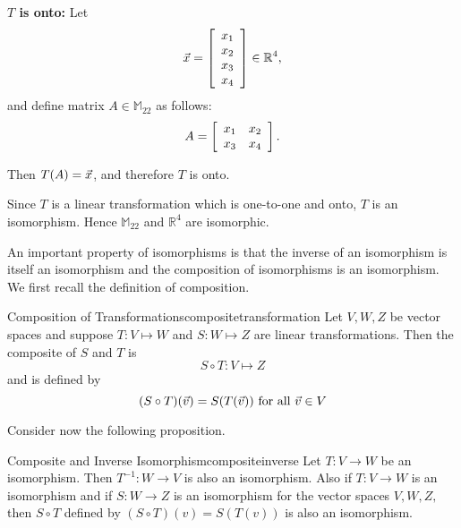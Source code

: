 \begin{solution}
\textbf{$T$ is onto:}
Let
\[ \vec{x}=\left[\begin{array}{c} x_1\\x_2\\x_3\\x_4 \end{array}\right]\in\mathbb{R}^4,\]
and
define matrix $A\in\mathbb{M}_{22}$ as follows:
\[ A=\left[\begin{array}{cc} x_1 & x_2 \\ x_3 & x_4 \end{array}\right].\]

Then $T(A)=\vec{x}$, and therefore $T$ is onto.

Since $T$ is a linear transformation which is one-to-one and onto, $T$ is an isomorphism. Hence $\mathbb{M}_{22}$ and $\mathbb{R}^4$ are isomorphic.
\end{solution}

An important property of isomorphisms is that the inverse of an isomorphism
is itself an isomorphism and the composition of isomorphisms is an
isomorphism. We first recall the definition of composition.

\begin{definition}{Composition of Transformations}{compositetransformation}
Let $V, W, Z$ be vector spaces and suppose $T: V \mapsto W$ and $S: W \mapsto Z$ are linear transformations. Then the composite of $S$ and $T$ is
\[
S \circ T: V \mapsto Z
\]
and is defined by 
\[
(S \circ T) (\vec{v}) = S(T(\vec{v})) \mbox{ for all } \vec{v} \in V
\]
\end{definition}

Consider now the following proposition.

\begin{proposition}{Composite and Inverse Isomorphism}{compositeinverse}
Let $T:V\rightarrow W$ be an isomorphism. Then $T^{-1}:W\rightarrow V$ is
also an isomorphism. Also if $T:V\rightarrow W$ is an isomorphism and if $
S:W\rightarrow Z$ is an isomorphism for the vector spaces $V,W,Z,$ then $
S\circ T$ defined by $\left( S\circ T\right) \left( v\right) = S\left(
T\left( v\right) \right) $ is also an isomorphism.
\end{proposition}

